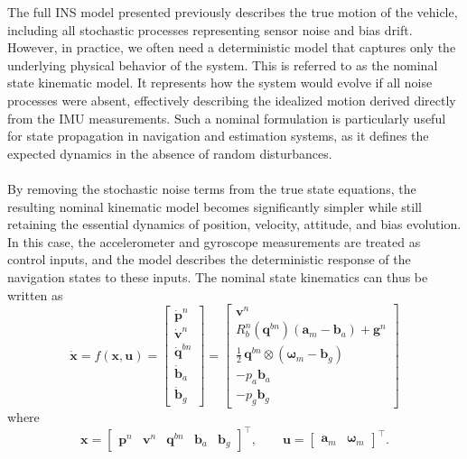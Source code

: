 The full INS model presented previously describes the true motion of the vehicle, including all stochastic processes representing sensor noise and bias drift. However, in practice, we often need a deterministic model that captures only the underlying physical behavior of the system. This is referred to as the nominal state kinematic model. It represents how the system would evolve if all noise processes were absent, effectively describing the idealized motion derived directly from the IMU measurements. Such a nominal formulation is particularly useful for state propagation in navigation and estimation systems, as it defines the expected dynamics in the absence of random disturbances.  
\\ \\
By removing the stochastic noise terms from the true state equations, the resulting nominal kinematic model becomes significantly simpler while still retaining the essential dynamics of position, velocity, attitude, and bias evolution. In this case, the accelerometer and gyroscope measurements are treated as control inputs, and the model describes the deterministic response of the navigation states to these inputs. The nominal state kinematics can thus be written as
$$
    \dot{\mathbf{x}} = f(\mathbf{x}, \mathbf{u}) =
    \begin{bmatrix}
        \dot{\mathbf{p}}^n \\
        \dot{\mathbf{v}}^n \\
        \dot{\mathbf{q}}^{bn} \\
        \dot{\mathbf{b}}_a \\
        \dot{\mathbf{b}}_g
    \end{bmatrix}
    =
    \begin{bmatrix}
        \mathbf{v}^n \\
        R_b^n(\mathbf{q}^{bn})(\mathbf{a}_m - \mathbf{b}_a) + \mathbf{g}^n \\
        \tfrac{1}{2}\,\mathbf{q}^{bn} \otimes (\boldsymbol{\omega}_m - \mathbf{b}_g) \\
        -p_a \mathbf{b}_a \\
        -p_g \mathbf{b}_g
    \end{bmatrix}
$$
where
$$
    \mathbf{x} =
    \begin{bmatrix}
        \mathbf{p}^n & \mathbf{v}^n & \mathbf{q}^{bn} & \mathbf{b}_a & \mathbf{b}_g
    \end{bmatrix}^\top,
    \qquad
    \mathbf{u} =
    \begin{bmatrix}
        \mathbf{a}_m & \boldsymbol{\omega}_m
    \end{bmatrix}^\top.
$$
